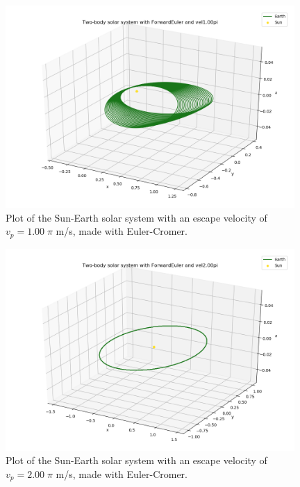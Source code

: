 \documentclass{article}
\begin{document}
    \begin{figure}[H]
        \centering
        \includegraphics[width = 11cm]{img/plot3D_S_E_F_vel100pi.png}
        \caption{Plot of the Sun-Earth solar system with an escape velocity of $v_p = 1.00 \; \pi$ m/s, made with Euler-Cromer. }
        \label{fig:plot3D_S_E_F_vel100pi}
    \end{figure}

    \begin{figure}[H]
        \centering
        \includegraphics[width = 11cm]{img/plot3D_S_E_F_vel200pi.png}
        \caption{Plot of the Sun-Earth solar system with an escape velocity of $v_p = 2.00 \; \pi$ m/s, made with Euler-Cromer. }
        \label{fig:plot3D_S_E_F_vel200pi}
    \end{figure}
\end{document}
